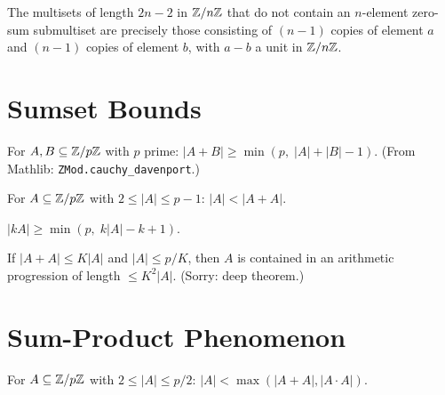 \begin{theorem}
  \label{thm:inverse_egz}
  The multisets of length $2n-2$ in $\mathbb{Z}/n\mathbb{Z}$ that do not contain an
  $n$-element zero-sum submultiset are precisely those consisting of
  $(n-1)$ copies of element $a$ and $(n-1)$ copies of element $b$,
  with $a - b$ a unit in $\mathbb{Z}/n\mathbb{Z}$.
\end{theorem}

\section{Sumset Bounds}

\begin{theorem}
  \label{thm:cauchy_davenport}
  \leanok
  For $A, B \subseteq \mathbb{Z}/p\mathbb{Z}$ with $p$ prime:
  $|A + B| \geq \min(p,\; |A| + |B| - 1)$.
  (From Mathlib: \texttt{ZMod.cauchy\_davenport}.)
\end{theorem}

\begin{theorem}[Doubling in $\ZZ/p\ZZ$]
  \label{thm:doubling_gt_one}
  \leanok
  For $A \subseteq \mathbb{Z}/p\mathbb{Z}$ with $2 \leq |A| \leq p-1$:
  $|A| < |A + A|$.
\end{theorem}

\begin{theorem}
  \label{thm:iterated_sumset}
  \leanok
  $|kA| \geq \min(p,\; k|A| - k + 1)$.
\end{theorem}

\begin{theorem}
  \label{thm:freiman}
  If $|A + A| \leq K|A|$ and $|A| \leq p/K$, then $A$ is contained in
  an arithmetic progression of length $\leq K^2 |A|$.
  (Sorry: deep theorem.)
\end{theorem}

\section{Sum-Product Phenomenon}

\begin{theorem}
  \label{thm:sum_product}
  \leanok
  For $A \subseteq \mathbb{Z}/p\mathbb{Z}$ with $2 \leq |A| \leq p/2$:
  $|A| < \max(|A + A|, |A \cdot A|)$.
\end{theorem}

